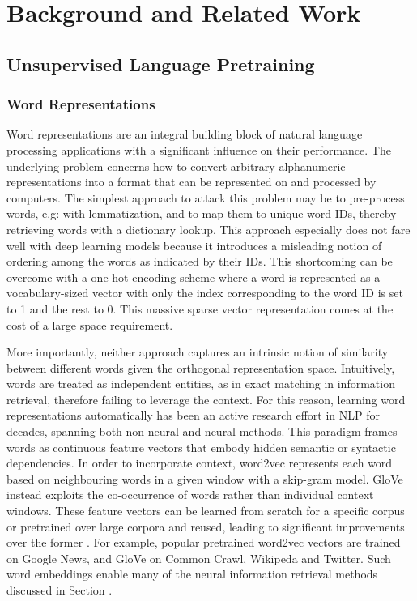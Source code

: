 \chapter{Background and Related Work}

\section{Unsupervised Language Pretraining}

\subsection{Word Representations}

Word representations are an integral building block of natural language processing applications with a significant influence on their performance.
The underlying problem concerns how to convert arbitrary alphanumeric representations into a format that can be represented on and processed by computers.
The simplest approach to attack this problem may be to pre-process words, e.g: with lemmatization, and to map them to unique word IDs, thereby retrieving words with a dictionary lookup.
This approach especially does not fare well with deep learning models because it introduces a misleading notion of ordering among the words as indicated by their IDs.
This shortcoming can be overcome with a one-hot encoding scheme where a word is represented as a vocabulary-sized vector with only the index corresponding to the word ID is set to 1 and the rest to 0.
This massive sparse vector representation comes at the cost of a large space requirement.

More importantly, neither approach captures an intrinsic notion of similarity between different words given the orthogonal representation space.
Intuitively, words are treated as independent entities, as in exact matching in information retrieval, therefore failing to leverage the context.
For this reason, learning word representations automatically has been an active research effort in NLP for decades, spanning both non-neural  and neural  methods.
This paradigm frames words as continuous feature vectors that embody hidden semantic or syntactic dependencies.
In order to incorporate context, word2vec \cite{mikolov2013distributed} represents each word based on neighbouring words in a given window with a skip-gram model.
GloVe \cite{pennington2014glove} instead exploits the co-occurrence of words rather than individual context windows.
These feature vectors can be learned from scratch for a specific corpus or pretrained over large corpora and reused, leading to significant improvements over the former \cite{turian2010word}.
For example, popular pretrained word2vec vectors are trained on Google News, and GloVe on Common Crawl, Wikipeda and Twitter.
Such word embeddings enable many of the neural information retrieval methods discussed in Section .

